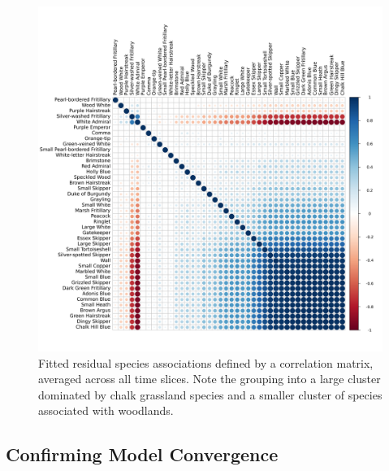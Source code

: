 \documentclass[
]{article}
\begin{document}
\begin{figure}
\centering
\includegraphics[width=\textwidth,height=0.8\textheight]{ButterflyMarkdowns/ButterflySIFigs/SpAssCoeffs.png}
\caption{Fitted residual species associations defined by a correlation
matrix, averaged across all time slices. Note the grouping into a large
cluster dominated by chalk grassland species and a smaller cluster of
species associated with woodlands.}
\end{figure}

\hypertarget{confirming-model-convergence}{%
\subsection{Confirming Model
Convergence}\label{confirming-model-convergence}}
\end{document}
